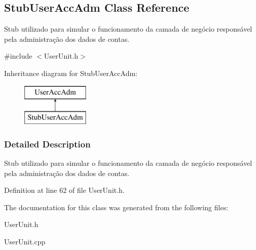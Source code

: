 \hypertarget{classStubUserAccAdm}{\subsection{Stub\-User\-Acc\-Adm Class Reference}
\label{d3/d88/classStubUserAccAdm}
}


Stub utilizado para simular o funcionamento da camada de negócio responsável pela administração dos dados de contas.  




{\ttfamily \#include $<$User\-Unit.\-h$>$}

Inheritance diagram for Stub\-User\-Acc\-Adm\-:\begin{figure}[H]
\begin{center}
\leavevmode
\includegraphics[height=2.000000cm]{d3/d88/classStubUserAccAdm}
\end{center}
\end{figure}


\subsubsection{Detailed Description}
Stub utilizado para simular o funcionamento da camada de negócio responsável pela administração dos dados de contas. 

Definition at line 62 of file User\-Unit.\-h.



The documentation for this class was generated from the following files\-:\begin{DoxyCompactItemize}
\item 
User\-Unit.\-h\item 
User\-Unit.\-cpp\end{DoxyCompactItemize}
